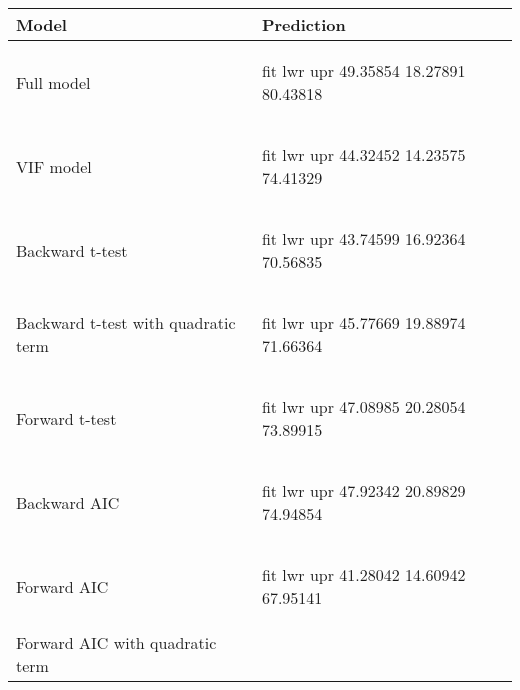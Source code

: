 \documentclass[a4paper]{article}
\begin{document}
\begin{longtable}{ l | p{10cm} }
\textbf{Model} & \textbf{Prediction} \\
\hline 
Full model &
\begin{Schunk}
\begin{Soutput}
      fit      lwr      upr
 49.35854 18.27891 80.43818
\end{Soutput}
\end{Schunk}
\\
VIF model &
\begin{Schunk}
\begin{Soutput}
      fit      lwr      upr
 44.32452 14.23575 74.41329
\end{Soutput}
\end{Schunk}
\\
Backward t-test &
\begin{Schunk}
\begin{Soutput}
      fit      lwr      upr
 43.74599 16.92364 70.56835
\end{Soutput}
\end{Schunk}
\\
Backward t-test with quadratic term &
\begin{Schunk}
\begin{Soutput}
      fit      lwr      upr
 45.77669 19.88974 71.66364
\end{Soutput}
\end{Schunk}
\\
Forward t-test &
\begin{Schunk}
\begin{Soutput}
      fit      lwr      upr
 47.08985 20.28054 73.89915
\end{Soutput}
\end{Schunk}
\\
Backward AIC &
\begin{Schunk}
\begin{Soutput}
      fit      lwr      upr
 47.92342 20.89829 74.94854
\end{Soutput}
\end{Schunk}
\\
Forward AIC &
\begin{Schunk}
\begin{Soutput}
      fit      lwr      upr
 41.28042 14.60942 67.95141
\end{Soutput}
\end{Schunk}
\\
Forward AIC with quadratic term&
\begin{Schunk}
\begin{Soutput}

\end{Soutput}
\end{Schunk}
\end{longtable}
\end{document}
